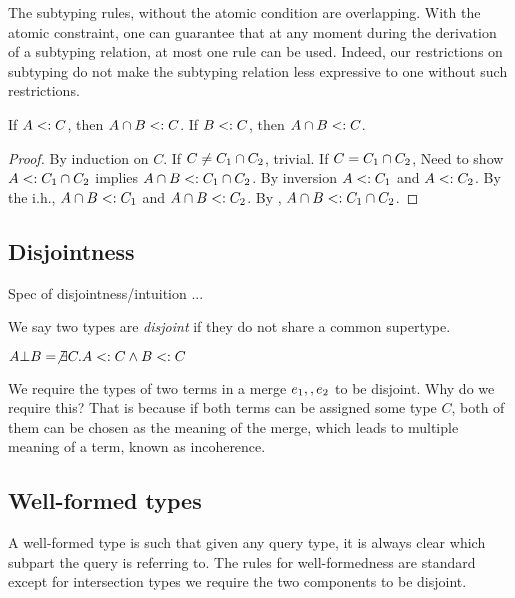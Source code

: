 The subtyping rules, without the atomic condition are overlapping. With the atomic constraint, one can guarantee that at any moment during the derivation of a subtyping relation, at most one rule can be used. Indeed, our restrictions on subtyping do not make the subtyping relation less expressive to one without such restrictions.


\begin{theorem}
  If $A <: C$, then $A \cap B <: C$.
  If $B <: C$, then $A \cap B <: C$.
\end{theorem}

\begin{proof}
  By induction on $C$.
  If $C \neq C_1 \cap C_2$, trivial.
  If $C = C_1 \cap C_2$,
  Need to show $A <: C_1 \cap C_2$ implies $A \cap B <: C_1 \cap C_2$.
  By inversion $A <: C_1$ and $A <: C_2$.
  By the i.h., $A \cap B <: C_1$ and $A \cap B <: C_2$.
  By , $A \cap B <: C_1 \cap C_2$.
\end{proof}

\subsection{Disjointness}

Spec of disjointness/intuition ...

We say two types are \emph{disjoint} if they do not share a common supertype.

\begin{definition}[Disjointness]
$A \bot B = \not \exists C. A <: C \wedge B <: C$
\end{definition}

We require the types of two terms in a merge $e_1 ,, e_2$ to be disjoint. Why do we require this? That is because if both terms can be assigned some type $C$, both of them can be chosen as the meaning of the merge, which leads to multiple meaning of a term, known as incoherence.

\subsection{Well-formed types}

A well-formed type is such that given any query type, it is always clear which subpart the query is referring to. The rules for well-formedness are standard except for intersection types we require the two components to be disjoint.

